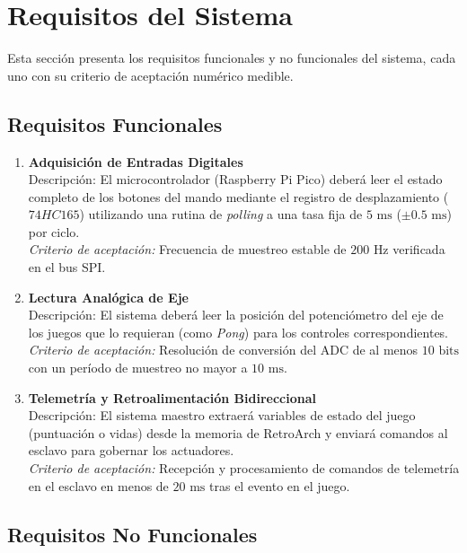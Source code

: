 \documentclass[conference]{IEEEtran}
\begin{document}
\section{Requisitos del Sistema}

Esta sección presenta los requisitos funcionales y no funcionales del sistema, cada uno con su criterio de aceptación numérico medible.

\subsection{Requisitos Funcionales}

\begin{enumerate}
	\item \textbf{Adquisición de Entradas Digitales} \\
	      Descripción: El microcontrolador (Raspberry Pi Pico) deberá leer el estado completo de los botones del mando mediante el registro de desplazamiento ($74HC165$) utilizando una rutina de \textit{polling} a una tasa fija de $5\text{ ms}$ ($\pm 0.5\text{ ms}$) por ciclo. \\
	      \textit{Criterio de aceptación:} Frecuencia de muestreo estable de $200\text{ Hz}$ verificada en el bus SPI.

	\item \textbf{Lectura Analógica de Eje} \\
	      Descripción: El sistema deberá leer la posición del potenciómetro del eje de los juegos que lo requieran (como \textit{Pong}) para los controles correspondientes. \\
	      \textit{Criterio de aceptación:} Resolución de conversión del ADC de al menos $10\text{ bits}$ con un período de muestreo no mayor a $10\text{ ms}$.

	\item \textbf{Telemetría y Retroalimentación Bidireccional} \\
	      Descripción: El sistema maestro extraerá variables de estado del juego (puntuación o vidas) desde la memoria de RetroArch y enviará comandos al esclavo para gobernar los actuadores. \\
	      \textit{Criterio de aceptación:} Recepción y procesamiento de comandos de telemetría en el esclavo en menos de $20\text{ ms}$ tras el evento en el juego.
\end{enumerate}

\subsection{Requisitos No Funcionales}
\end{document}
